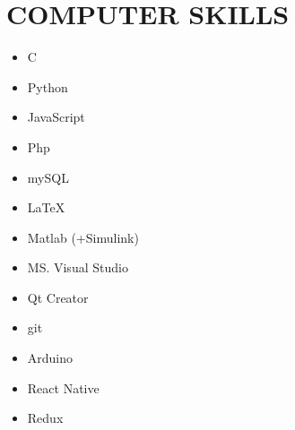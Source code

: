\documentclass[10pt,a4paper,sans]{moderncv} %
\newcommand*{\authorimg}[1]{%
	\raisebox{-.3\baselineskip}{%
		\texttt{[image: \#1]}%
	}%
}
\begin{document}
\section{COMPUTER SKILLS}

\vspace{1em}

\begin{cvcolumns}
	{\begin{itemize}
	  		\item \authorimg{pictures/cpp.png} C\raisebox{1pt}{\tiny++}
	  		\item \authorimg{pictures/python.png} Python 
	  		\item \authorimg{pictures/js.png} JavaScript
	  		\item \authorimg{pictures/php.png} Php
	  		\item \authorimg{pictures/mysql.png} mySQL
	  		\item \authorimg{pictures/latex.png} \LaTeX
  		\end{itemize}}
  	
  
	{\begin{itemize}
			\item \authorimg{pictures/matlab.jpg} Matlab (+Simulink) 
	 		\item \authorimg{pictures/visual.png} MS. Visual Studio 
	 		\item \authorimg{pictures/qt.png} Qt Creator 
	 		\item \authorimg{pictures/git.png} git 
	 		\item \authorimg{pictures/arduino.png} Arduino
	 	\end{itemize}}
 	
 	{\begin{itemize}
 			\item \authorimg{pictures/react.jpg} React Native
 			\item \authorimg{pictures/redux.png} Redux 
 	\end{itemize}}
 	
\end{cvcolumns}
\end{document}
